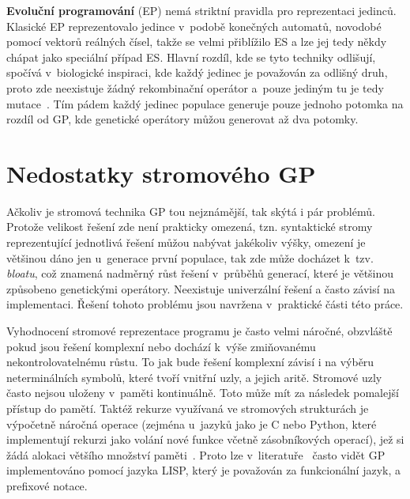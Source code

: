 \textbf{Evoluční programování} (EP) nemá striktní pravidla pro reprezentaci jedinců.  Klasické EP reprezentovalo jedince v~podobě konečných automatů, novodobé pomocí vektorů reálných čísel, takže se velmi přiblížilo ES a lze jej tedy někdy chápat jako speciální případ ES. Hlavní rozdíl, kde se tyto techniky odlišují, spočívá v~biologické inspiraci, kde každý jedinec je považován za odlišný druh, proto zde neexistuje žádný rekombinační operátor a~pouze jediným tu je tedy mutace~\cite{eiben-2015B}. Tím pádem každý jedinec populace generuje pouze jednoho potomka na rozdíl od GP, kde genetické operátory můžou generovat až dva potomky.

\section{Nedostatky stromového GP}
Ačkoliv je stromová technika GP tou nejznámější, tak skýtá i pár problémů. Protože velikost řešení zde není prakticky omezená, tzn. syntaktické stromy reprezentující jednotlivá řešení můžou nabývat jakékoliv výšky, omezení je většinou dáno jen u~generace první populace, tak zde může docházet k~tzv. \emph{bloatu}, což znamená nadměrný růst řešení v~průběhů generací, které je většinou způsobeno genetickými operátory. Neexistuje univerzální řešení a často závisí na implementaci. Řešení tohoto problému jsou navržena v~praktické části této práce. 

Vyhodnocení stromové reprezentace programu je často velmi náročné, obzvláště pokud jsou řešení komplexní nebo dochází k~výše zmiňovanému nekontrolovatelnému růstu. To jak bude řešení komplexní závisí i na výběru neterminálních symbolů, které tvoří vnitřní uzly, a jejich aritě. Stromové uzly často nejsou uloženy v~paměti kontinuálně. Toto může mít za následek pomalejší přístup do pamětí. Taktéž rekurze využívaná ve stromových strukturách je výpočetně náročná operace (zejména u~jazyků jako je C nebo Python, které implementují rekurzi jako volání nové funkce včetně zásobníkových operací), jež si žádá alokaci většího množství paměti~\cite{RecursionAndLooping}. Proto lze v~literatuře~\cite{Brameier1998} často vidět GP implementováno pomocí jazyka LISP, který je považován za funkcionální jazyk, a prefixové notace.   


